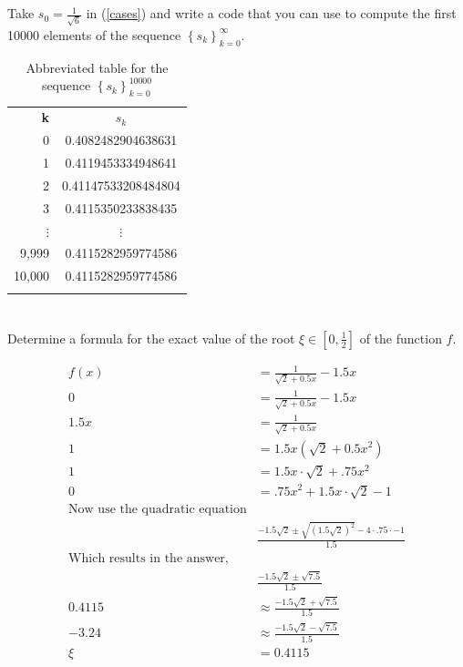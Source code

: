 \documentclass{article}
\begin{document}
\section{}
Take $s_0 = \frac{1}{\sqrt{6}}$ in (\ref{cases}) and write a code that you can use to compute the first 10000 elements of the sequence $\left\{ s_k \right\}^{\infty}_{k=0}$.
\vspace{10mm}




\begin{table}[H]
    \centering
    \begin{tabular}{|r|c|}
        \Xhline{1 pt}
         \textbf{k}& \textbf{$s_k$}  \\
         \Xhline{1.5 pt}
         0 & 0.4082482904638631\\
         \Xhline{1 pt}
         1 & 0.4119453334948641\\
         \Xhline{1 pt}
         2 & 0.41147533208484804\\
         \Xhline{1 pt}
         3 & 0.4115350233838435\\
         \Xhline{1 pt}
         $\vdots$ & $\vdots$\\
          \Xhline{1 pt}
         9,999 & 0.4115282959774586\\
          \Xhline{1 pt}
         10,000 & 0.4115282959774586\\
         \Xhline{1 pt}
    \end{tabular}
    \caption{Abbreviated table for the sequence $\left\{ s_k\right\}_{k=0}^{10000}$}
    \label{tab:10sequence}
\end{table}


\section{}
Determine a formula for the exact value of the root $\xi \in \left[0,\frac{1}{2} \right]$ of the function $f$.
\vspace{10mm}

\begin{align*}
    f(x) &= \frac{1}{\sqrt{2}+0.5x}-1.5x\\
    0 & = \frac{1}{\sqrt{2}+0.5x}-1.5x\\
    1.5x &= \frac{1}{\sqrt{2}+0.5x}\\
    1 &= 1.5x(\sqrt{2}+0.5x^2)\\
    1 &= 1.5x\cdot \sqrt{2}+ .75x^2\\
    0 &=  .75x^2+ 1.5x\cdot \sqrt{2}-1\\
    \text{Now use the quadratic equation}&\\
    &\frac{-1.5\sqrt{2} \pm \sqrt{(1.5\sqrt{2})^2}-4\cdot.75\cdot -1}{1.5}\\
    \text{Which results in the answer,}&\\
    &\frac{-1.5\sqrt{2}\pm \sqrt{7.5}}{1.5}\\
    0.4115 &\approx \frac{-1.5\sqrt{2}+ \sqrt{7.5}}{1.5}\\
    -3.24 &\approx \frac{-1.5\sqrt{2}- \sqrt{7.5}}{1.5}\\
    \xi &= 0.4115\\
\end{align*}
\end{document}
